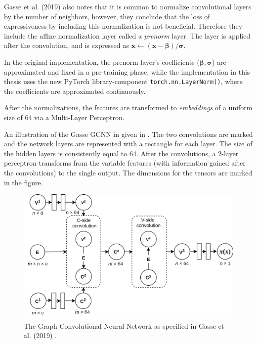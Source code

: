 Gasse et al. (2019) \cite{gasse2019exact} also notes that it is common to normalize convolutional layers by the number of neighbors, however, they conclude that the loss of expressiveness by including this normalization is not beneficial. Therefore they include the affine normalization layer called a \textit{prenorm} layer. The layer is applied after the convolution, and is expressed as $ \mathbf{x} \leftarrow (\mathbf{x}-\bm{\beta})/\bm{\sigma}$. 

In the original implementation, the prenorm layer's coefficients ($\bm{\beta}, \bm{\sigma}$) are approximated and fixed in a pre-training phase, while the implementation in this thesis uses the new PyTorch library-component \verb|torch.nn.LayerNorm()|, where the coefficients are approximated continuously.     

After the normalizations, the features are transformed to \textit{embeddings} of a uniform size of 64 via a Multi-Layer Perceptron. 

An illustration of the Gasse \gls{GCNN} in given in . The two convolutions are marked and the network layers are represented with a rectangle for each layer. The size of the hidden layers is consistently equal to 64. After the convolutions, a 2-layer perceptron transforms from the variable features (with information gained after the convolutions) to the single output. The dimensions for the tensors are marked in the figure. 
\begin{figure}
    \centering
    \includegraphics[width=\linewidth]{img/gnn_2.png}
    \caption{The Graph Convolutional Neural Network as specified in Gasse et al. (2019) \cite{gasse2019exact}.}
    \label{fig:gnn2}
\end{figure}






